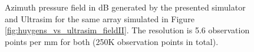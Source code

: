 \begin{figure}[!t]
\centerline{
}
\caption{Azimuth pressure field in dB generated by the presented simulator and Ultrasim for the same array simulated in Figure \ref{fig:huygens_vs_ultrasim_fieldII}. The resolution is 5.6 observation points per mm for both (250K observation points in total).}
\label{fig:huygens_vs_ultrasim_pressure_field}
\end{figure}

